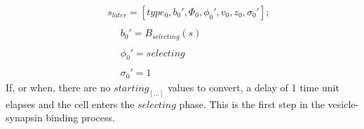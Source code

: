\documentclass{acm_proc_article-sp}
\begin{document}
\begin{displaymath}
\begin{array}{l}
\hspace{16pt} s_{later} = [type_0, b_0', \Phi_0, \phi_0', v_0, z_0, \sigma_0']; \\
\\
\hspace{16pt} \hspace{16pt} b_0' = B_{selecting}(s) \\
\\
\hspace{16pt} \hspace{16pt} \phi_0' = selecting \\
\\
\hspace{16pt} \hspace{16pt} \sigma_0' = 1 
\end{array} \end{displaymath}
If, or when, there are no $starting_{[...]}$ values to convert, a delay of 1 
time unit elapses and the cell enters the $selecting$ phase.  This is the 
first step in the vesicle-synapsin binding process.
\end{document}
